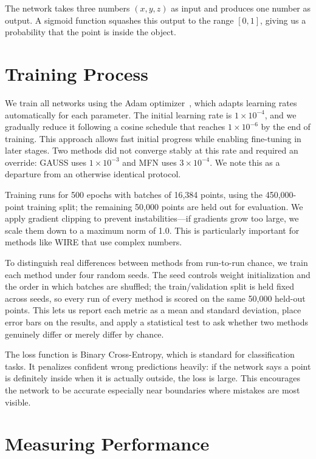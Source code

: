 The network takes three numbers $(x, y, z)$ as input and produces one number as output. A sigmoid function squashes this output to the range $[0, 1]$, giving us a probability that the point is inside the object.

\section{Training Process}

We train all networks using the Adam optimizer~\cite{kingma2014adam}, which adapts learning rates automatically for each parameter. The initial learning rate is $1 \times 10^{-4}$, and we gradually reduce it following a cosine schedule that reaches $1 \times 10^{-6}$ by the end of training. This approach allows fast initial progress while enabling fine-tuning in later stages. Two methods did not converge stably at this rate and required an override: GAUSS uses $1 \times 10^{-3}$ and MFN uses $3 \times 10^{-4}$. We note this as a departure from an otherwise identical protocol.

Training runs for 500 epochs with batches of 16,384 points, using the 450,000-point training split; the remaining 50,000 points are held out for evaluation. We apply gradient clipping to prevent instabilities---if gradients grow too large, we scale them down to a maximum norm of 1.0. This is particularly important for methods like WIRE that use complex numbers.

To distinguish real differences between methods from run-to-run chance, we train each method under four random seeds. The seed controls weight initialization and the order in which batches are shuffled; the train/validation split is held fixed across seeds, so every run of every method is scored on the same 50,000 held-out points. This lets us report each metric as a mean and standard deviation, place error bars on the results, and apply a statistical test to ask whether two methods genuinely differ or merely differ by chance.

The loss function is Binary Cross-Entropy, which is standard for classification tasks. It penalizes confident wrong predictions heavily: if the network says a point is definitely inside when it is actually outside, the loss is large. This encourages the network to be accurate especially near boundaries where mistakes are most visible.

\section{Measuring Performance}

